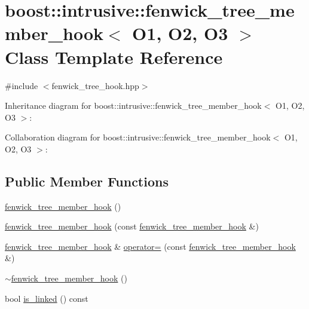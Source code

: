 \hypertarget{classboost_1_1intrusive_1_1fenwick__tree__member__hook}{}\section{boost\+:\+:intrusive\+:\+:fenwick\+\_\+tree\+\_\+member\+\_\+hook$<$ O1, O2, O3 $>$ Class Template Reference}
\label{classboost_1_1intrusive_1_1fenwick__tree__member__hook}


{\ttfamily \#include $<$fenwick\+\_\+tree\+\_\+hook.\+hpp$>$}



Inheritance diagram for boost\+:\+:intrusive\+:\+:fenwick\+\_\+tree\+\_\+member\+\_\+hook$<$ O1, O2, O3 $>$\+:


Collaboration diagram for boost\+:\+:intrusive\+:\+:fenwick\+\_\+tree\+\_\+member\+\_\+hook$<$ O1, O2, O3 $>$\+:
\subsection*{Public Member Functions}
\begin{DoxyCompactItemize}
\item 
\hyperlink{classboost_1_1intrusive_1_1fenwick__tree__member__hook_afc015619c9efba32c7ebe1a04bc19cd9}{fenwick\+\_\+tree\+\_\+member\+\_\+hook} ()
\item 
\hyperlink{classboost_1_1intrusive_1_1fenwick__tree__member__hook_abf102afc33913d27713a83bbe84a224a}{fenwick\+\_\+tree\+\_\+member\+\_\+hook} (const \hyperlink{classboost_1_1intrusive_1_1fenwick__tree__member__hook}{fenwick\+\_\+tree\+\_\+member\+\_\+hook} \&)
\item 
\hyperlink{classboost_1_1intrusive_1_1fenwick__tree__member__hook}{fenwick\+\_\+tree\+\_\+member\+\_\+hook} \& \hyperlink{classboost_1_1intrusive_1_1fenwick__tree__member__hook_ab810e0f0d6058c6bf8b679003b097b71}{operator=} (const \hyperlink{classboost_1_1intrusive_1_1fenwick__tree__member__hook}{fenwick\+\_\+tree\+\_\+member\+\_\+hook} \&)
\item 
\hyperlink{classboost_1_1intrusive_1_1fenwick__tree__member__hook_a372590a3dab9a2ab85267409010d972a}{$\sim$fenwick\+\_\+tree\+\_\+member\+\_\+hook} ()
\item 
bool \hyperlink{classboost_1_1intrusive_1_1fenwick__tree__member__hook_a3d23f59a0cf4e9d4e04b5e520912f47a}{is\+\_\+linked} () const
\end{DoxyCompactItemize}


